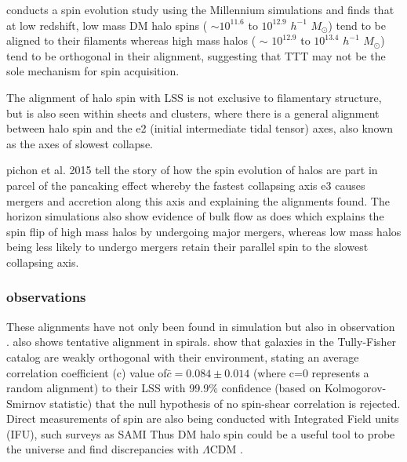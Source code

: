 \documentclass[a4paper,fleqn,usenatbib]{mnras}
\def \lcdm{$\Lambda$CDM }
\begin{document}
\citet{Trowland_13} conducts a spin evolution study using the Millennium simulations and finds that at low redshift, low mass DM halo spins ( $\sim$$10^{11.6}$ to $10^{12.9}$ $h^{-1}$ \(M_\odot\)) tend to be aligned to their filaments whereas high mass halos ( $\sim$ $10^{12.9}$ to $10^{13.4}$ $h^{-1}$ \(M_\odot\)) tend to be orthogonal in their alignment, suggesting that TTT may not be the sole mechanism for spin acquisition.  

The alignment of halo spin with LSS is not exclusive to filamentary structure, but is also seen within sheets and clusters, where there is a general alignment between halo spin and the e2 (initial intermediate tidal tensor) axes, also known as the axes of slowest collapse. \citep{Libeskind_12,Dubois_14,Calvo_14,Kang_15,Wang_17,Veena_18} 

\citet{Bond_96,Codis_12} pichon et al. 2015 tell the story of how the spin evolution of halos are part in parcel of the pancaking effect whereby the fastest collapsing axis e3 causes mergers and accretion along this axis and explaining the alignments found. The horizon simulations \citep{Dubois_14,Welker_14} also show evidence of bulk flow as does \citep{Trowland_13} which explains the spin flip of high mass halos by undergoing major mergers, whereas low mass halos being less likely to undergo mergers retain their parallel spin to the slowest collapsing axis.

\subsubsection{observations}
These alignments have not only been found in simulation but also in observation \citep{Jones_10}. \citet{Pen_00} also shows tentative alignment in spirals. 
\citet{Lee_Erdogdu_07} show that galaxies in the Tully-Fisher catalog are weakly orthogonal with their environment, stating an average correlation coefficient (c) value of$\bar{c}=0.084\pm 0.014$ (where c=0 represents a random alignment) to their LSS with 99.9$\%$ confidence (based on Kolmogorov-Smirnov statistic) that the null hypothesis of no spin-shear correlation is rejected. 
\\
Direct measurements of spin are also being conducted with Integrated Field units (IFU), such surveys as SAMI \citep{Croom_12} Thus DM halo spin could be a useful tool to probe the universe and find discrepancies with \lcdm.
\end{document}
